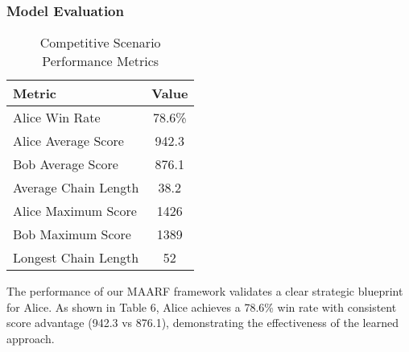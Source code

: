 \documentclass[twocolumn, a4paper]{article}
\begin{document}
\subsubsection{Model Evaluation}
\begin{table}[h]
\centering
\caption{Competitive Scenario Performance Metrics}
\label{tab:competitive_results}
\begin{tabular}{lc}
\hline
\textbf{Metric} & \textbf{Value} \\
\hline
Alice Win Rate & 78.6\% \\
Alice Average Score & 942.3 \\
Bob Average Score & 876.1 \\
Average Chain Length & 38.2 \\
Alice Maximum Score & 1426 \\
Bob Maximum Score & 1389 \\
Longest Chain Length & 52 \\
\hline
\end{tabular}
\end{table}
The performance of our MAARF framework validates a clear strategic blueprint for Alice. As shown in Table 6, Alice achieves a 78.6\% win rate with consistent score advantage (942.3 vs 876.1), demonstrating the effectiveness of the learned approach.
\end{document}
